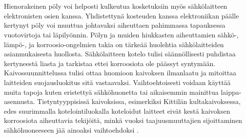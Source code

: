 \documentclass[finnish,12pt,a4paper,pdftex,elec,utf8]{aaltothesis}
\begin{document}
\\\\
Hienorakeinen pöly voi helposti kulkeutua kosketuksiin myös sähkölaitteen elektronisten osien kanssa. Yhdistettynä kosteuden kanssa elektroniikan päälle kertynyt pöly voi muuttua johtavaksi aiheuttaen pahimmassa tapauksessa vuotovirtoja tai läpilyönnin. \cite{Pallasmaa} Pölyn ja muiden hiukkasten aiheuttamien sähkö-, lämpö-, ja korroosio-ongelmien takia on tärkeää huolehtia sähkölaitteiden asianmukaisesta huollosta. Sähkölaitteen kotelo tulisi säännöllisesti puhdistaa kertyneestä liasta ja tarkistaa ettei korroosiota ole päässyt syntymään. Kaivossuunnittelussa tulisi ottaa huomioon kaivoksen ilmanlaatu ja mitoittaa laitteiden suojausluokitus sitä vastaavaksi. Vaihtoehtoisesti voidaan käyttää muita tapoja kuten eristettyä sähköhuonetta tai aikaisemmin mainittua laippa-asennusta. Tietyntyyppisissä kaivoksissa, esimerkiksi Kittilän kultakaivoksessa, edes suurimmalla kotelointiluokalla koteloidut laitteet eivät kestä kaivoksen korroosiota aiheuttavia tekijöitä, minkä vuoksi taajuusmuuttajien sijoittaminen sähköhuoneeseen jää ainoaksi vaihtoehdoksi \cite{MyyntiHaastattelu}.

\end{document}
